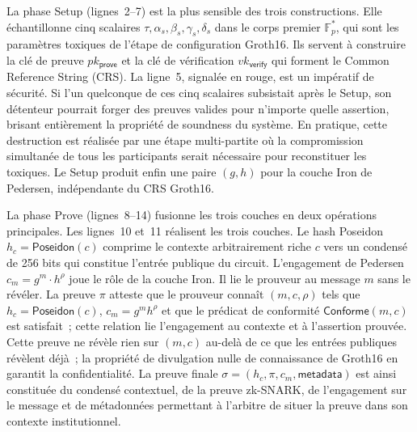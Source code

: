 \begin{sloppypar}
La phase \textsf{Setup} (lignes~2--7) est la plus sensible des trois
constructions. Elle \'echantillonne cinq scalaires $\tau, \alpha_s,
\beta_s, \gamma_s, \delta_s$ dans le corps premier $\mathbb{F}_p^*$, qui
sont les param\`etres toxiques de l'\'etape de configuration
Groth16. Ils servent \`a construire la cl\'e de preuve $pk_{\mathsf{prove}}$
et la cl\'e de v\'erification $vk_{\mathsf{verify}}$ qui forment le
Common Reference String (CRS). La ligne~5, signal\'ee en rouge, est
un imp\'eratif de s\'ecurit\'e. Si l'un quelconque de ces cinq
scalaires subsistait apr\`es le \textsf{Setup}, son d\'etenteur pourrait
forger des preuves valides pour n'importe quelle assertion, brisant
enti\`erement la propri\'et\'e de soundness du syst\`eme. En pratique,
cette destruction est r\'ealis\'ee par une \'etape multi-partite
o\`u la compromission simultan\'ee de tous les participants serait
n\'ecessaire pour reconstituer les toxiques. Le Setup produit enfin
une paire $(g, h)$ pour la couche Iron de Pedersen, ind\'ependante
du CRS Groth16.

La phase \textsf{Prove} (lignes~8--14) fusionne les trois couches
en deux op\'erations principales. Les lignes~10 et~11 r\'ealisent les
trois couches. Le hash Poseidon $h_c =
\mathsf{Poseidon}(c)$ comprime le contexte arbitrairement riche $c$
vers un condens\'e de 256 bits qui constitue l'entr\'ee publique du
circuit. L'engagement de Pedersen $c_m = g^m \cdot h^\rho$ joue le r\^ole de
la couche Iron. Il lie le prouveur au message $m$ sans le r\'ev\'eler. La
preuve $\pi$ atteste que le prouveur conna\^it $(m, c, \rho)$ tels que
$h_c = \mathsf{Poseidon}(c)$, $c_m = g^m h^\rho$ et que le pr\'edicat de
conformit\'e $\mathsf{Conforme}(m, c)$ est satisfait~; cette relation
lie l'engagement au contexte et \`a l'assertion prouv\'ee. Cette preuve ne
r\'ev\`ele rien sur $(m, c)$ au-del\`a de ce que les entr\'ees publiques
r\'ev\`elent d\'ej\`a~; la propri\'et\'e de divulgation nulle de connaissance de
Groth16 en garantit la confidentialit\'e. La preuve finale $\sigma = (h_c, \pi, c_m,
\mathsf{metadata})$ est ainsi constitu\'ee du condens\'e contextuel,
de la preuve zk-SNARK, de l'engagement sur le message et de
m\'etadonn\'ees permettant \`a l'arbitre de situer la preuve dans son
contexte institutionnel.


\end{sloppypar}
